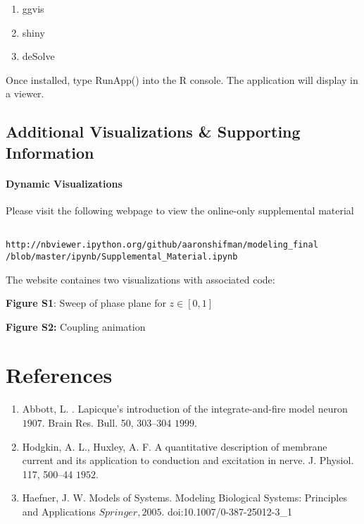 \documentclass[11pt]{report}
\begin{document}
\begin{enumerate}
  \item ggvis
  \item shiny
  \item deSolve
\end{enumerate}

Once installed, type RunApp() into the R console. The application will display in a viewer.


\section{Additional Visualizations \& Supporting Information} %
\label{sec:web_app}


\subsubsection{Dynamic Visualizations} %
\label{ssub:dynamic_visualizations}

Please visit the following webpage to view the online-only supplemental material

\begin{lstlisting}
  
http://nbviewer.ipython.org/github/aaronshifman/modeling_final
/blob/master/ipynb/Supplemental_Material.ipynb

\end{lstlisting}


The website containes two visualizations with associated code:

\textbf{Figure S1}: Sweep of phase plane for $z \in [0,1]$

\textbf{Figure S2:} Coupling animation



\chapter{References} %
\label{sec:references}

\begin{enumerate}
  \item Abbott, L. . Lapicque’s introduction of the integrate-and-fire model neuron \(1907\). Brain Res. Bull. 50, 303–304 \(1999\).
  \item Hodgkin, A. L., Huxley, A. F. A quantitative description of membrane current and its application to conduction and excitation in nerve. J. Physiol. 117, 500–44 \(1952\).
  \item Haefner, J. W. Models of Systems. Modeling Biological Systems: Principles and Applications \(Springer, 2005\). doi:10.1007/0-387-25012-3\_1
\end{enumerate}


\end{document}
